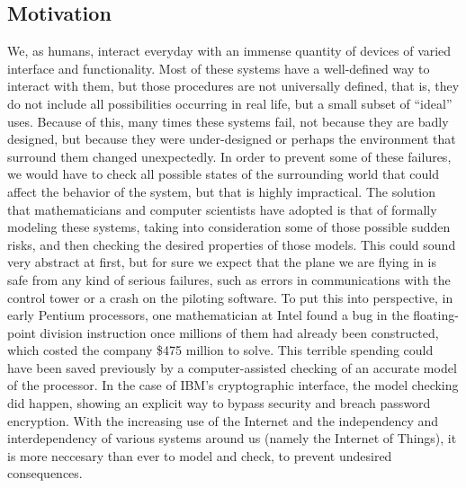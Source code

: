 \documentclass[11pt]{article}
\theoremstyle{definition}
\theoremstyle{plain}
\theoremstyle{definition}
\begin{document}
\subsection{Motivation}
We, as humans, interact everyday with an immense quantity of devices of varied interface and functionality. Most of these systems have a well-defined way to interact with them, but those procedures are not universally defined, that is, they do not include all possibilities occurring in real life, but a small subset of “ideal” uses. Because of this, many times these systems fail, not because they are badly designed, but because they were under-designed or perhaps the environment that surround them changed unexpectedly.
In order to prevent some of these failures, we would have to check all possible states of the surrounding world that could affect the behavior of the system, but that is highly impractical. The solution that mathematicians and computer scientists have adopted is that of formally modeling these systems, taking into consideration some of those possible sudden risks, and then checking the desired properties of those models.
This could sound very abstract at first, but for sure we expect that the plane we are flying in is safe from any kind of serious failures, such as errors in communications with the control tower or a crash on the piloting software.
To put this into perspective, in early Pentium processors, one mathematician at Intel found a bug in the floating-point division instruction once millions of them had already been constructed, which costed the company \$475 million to solve. This terrible spending could have been saved previously by a computer-assisted checking of an accurate model of the processor. In the case of IBM's cryptographic interface, the model checking did happen, showing an explicit way to bypass security and breach password encryption.
With the increasing use of the Internet and the independency and interdependency of various systems around us (namely the Internet of Things), it is more neccesary than ever to model and check, to prevent undesired consequences.
\end{document}
